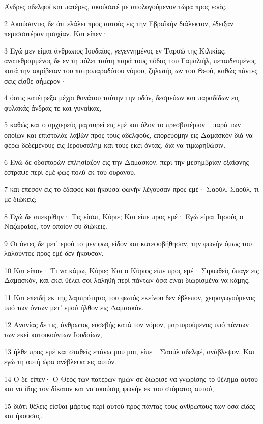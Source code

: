 \par Άνδρες αδελφοί και πατέρες, ακούσατέ με απολογούμενον τώρα προς εσάς.
\par 2 Ακούσαντες δε ότι ελάλει προς αυτούς εις την Εβραϊκήν διάλεκτον, έδειξαν περισσοτέραν ησυχίαν. Και είπεν·
\par 3 Εγώ μεν είμαι άνθρωπος Ιουδαίος, γεγεννημένος εν Ταρσώ της Κιλικίας, ανατεθραμμένος δε εν τη πόλει ταύτη παρά τους πόδας του Γαμαλιήλ, πεπαιδευμένος κατά την ακρίβειαν του πατροπαραδότου νόμου, ζηλωτής ων του Θεού, καθώς πάντες σεις είσθε σήμερον·
\par 4 όστις κατέτρεξα μέχρι θανάτου ταύτην την οδόν, δεσμεύων και παραδίδων εις φυλακάς άνδρας τε και γυναίκας,
\par 5 καθώς και ο αρχιερεύς μαρτυρεί εις εμέ και όλον το πρεσβυτέριον· παρά των οποίων και επιστολάς λαβών προς τους αδελφούς, επορευόμην εις Δαμασκόν διά να φέρω δεδεμένους εις Ιερουσαλήμ και τους εκεί όντας, διά να τιμωρηθώσιν.
\par 6 Ενώ δε οδοιπορών επλησίαζον εις την Δαμασκόν, περί την μεσημβρίαν εξαίφνης έστραψε περί εμέ φως πολύ εκ του ουρανού,
\par 7 και έπεσον εις το έδαφος και ήκουσα φωνήν λέγουσαν προς εμέ· Σαούλ, Σαούλ, τι με διώκεις;
\par 8 Εγώ δε απεκρίθην· Τις είσαι, Κύριε; Και είπε προς εμέ· Εγώ είμαι Ιησούς ο Ναζωραίος, τον οποίον συ διώκεις.
\par 9 Οι όντες δε μετ' εμού το μεν φως είδον και κατεφοβήθησαν, την φωνήν όμως του λαλούντος προς εμέ δεν ήκουσαν.
\par 10 Και είπον· Τι να κάμω, Κύριε; Και ο Κύριος είπε προς εμέ· Σηκωθείς ύπαγε εις Δαμασκόν, και εκεί θέλει σοι λαληθή περί πάντων όσα είναι διωρισμένα να κάμης.
\par 11 Και επειδή εκ της λαμπρότητος του φωτός εκείνου δεν έβλεπον, χειραγωγούμενος υπό των όντων μετ' εμού ήλθον εις Δαμασκόν.
\par 12 Ανανίας δε τις, άνθρωπος ευσεβής κατά τον νόμον, μαρτυρούμενος υπό πάντων των εκεί κατοικούντων Ιουδαίων,
\par 13 ήλθε προς εμέ και σταθείς επάνω μου μοι, είπε· Σαούλ αδελφέ, ανάβλεψον. Και εγώ τη αυτή ώρα ανέβλεψα εις αυτόν.
\par 14 Ο δε είπεν· Ο Θεός των πατέρων ημών σε διώρισε να γνωρίσης το θέλημα αυτού και να ίδης τον δίκαιον και να ακούσης φωνήν εκ του στόματος αυτού,
\par 15 διότι θέλεις είσθαι μάρτυς περί αυτού προς πάντας τους ανθρώπους των όσα είδες και ήκουσας.
